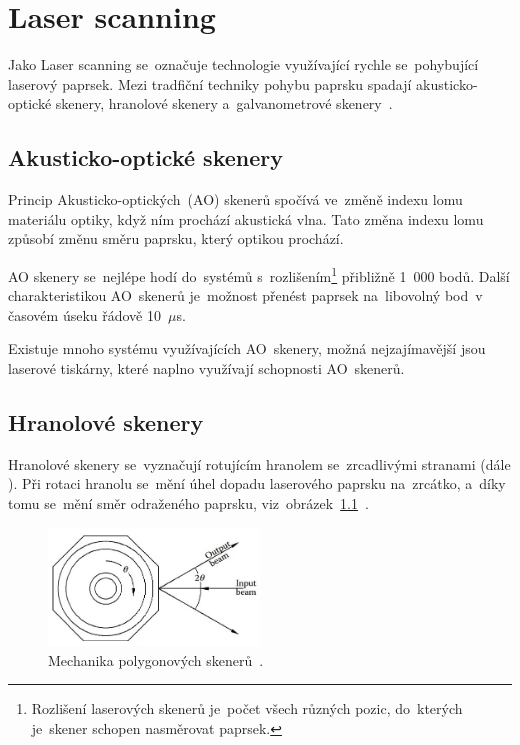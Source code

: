 \chapter{Laser scanning}

Jako Laser scanning se~označuje technologie využívající rychle se~pohybující laserový paprsek. Mezi tradfiční techniky pohybu paprsku spadají akusticko-optické skenery, hranolové skenery a~galvanometrové skenery~\cite{mems-review}.

\section{Akusticko-optické skenery}
Princip Akusticko-optických~(AO) skenerů spočívá ve~změně indexu lomu materiálu optiky, když ním prochází akustická vlna. Tato změna indexu lomu způsobí změnu směru paprsku, který optikou prochází.~\cite{scanning-handbook}

AO skenery se~nejlépe hodí do~systémů s~rozlišením\footnote{Rozlišení laserových skenerů je~počet všech různých pozic, do~kterých je~skener schopen nasměrovat paprsek.} přibližně 1~000 bodů.
Další charakteristikou AO~skenerů je~možnost přenést paprsek na~libovolný bod~v časovém úseku řádově 10~$\mu$s.~\cite{scanning-handbook}

Existuje mnoho systému využívajících AO~skenery, možná nejzajímavější jsou laserové tiskárny, které naplno využívají schopnosti AO~skenerů.~\cite{scanning-handbook}

\section{Hranolové skenery}
Hranolové skenery se~vyznačují rotujícím hranolem se~zrcadlivými stranami (dále ).
Při rotaci hranolu se~mění úhel dopadu laserového paprsku na~zrcátko, a~díky tomu se~mění směr odraženého paprsku, viz~obrázek~\ref{fig:polygon-scanner}~\cite{scanning-handbook}.

\begin{figure}[H]
  \centering
  \includegraphics[width=0.5\textwidth]{img/polygon-scanner.jpg}
  \caption{\label{fig:polygon-scanner} Mechanika polygonových skenerů~\cite{scanning-handbook}.}
\end{figure}

